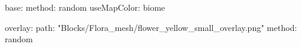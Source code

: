 base:
  method: random
  useMapColor: biome
  
overlay:
  path: "Blocks/Flora_mesh/flower_yellow_small_overlay.png"
  method: random